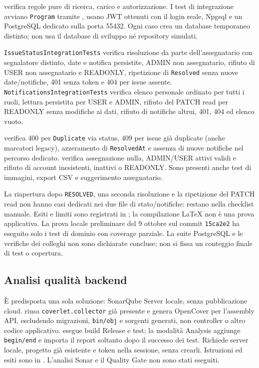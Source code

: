 \documentclass[12pt,a4paper]{article}
\begin{document}
 verifica regole pure di ricerca, carico e autorizzazione. I test di integrazione avviano \texttt{Program} tramite , usano JWT ottenuti con il login reale, Npgsql e un PostgreSQL dedicato sulla porta 55432. Ogni caso crea un database temporaneo distinto; non usa il database di sviluppo né repository simulati.

\texttt{IssueStatusIntegrationTests} verifica risoluzione da parte dell'assegnatario con segnalatore distinto, date e notifica persistite, ADMIN non assegnatario, rifiuto di USER non assegnatario e READONLY, ripetizione di \texttt{Resolved} senza nuove date/notifiche, 401 senza token e 404 per issue assente. \texttt{NotificationsIntegrationTests} verifica elenco personale ordinato per tutti i ruoli, lettura persistita per USER e ADMIN, rifiuto del PATCH read per READONLY senza modifiche ai dati, rifiuto di notifiche altrui, 401, 404 ed elenco vuoto.

 verifica 400 per \texttt{Duplicate} via status, 409 per issue già duplicate (anche marcatori legacy), azzeramento di \texttt{ResolvedAt} e assenza di nuove notifiche nel percorso dedicato.  verifica assegnazione nulla, ADMIN/USER attivi validi e rifiuto di account inesistenti, inattivi o READONLY. Sono presenti anche test di immagini, export CSV e suggerimento assegnatario.

La riapertura dopo \texttt{RESOLVED}, una seconda risoluzione e la ripetizione del PATCH read non hanno casi dedicati nei due file di stato/notifiche: restano nella checklist manuale. Esiti e limiti sono registrati in ; la compilazione LaTeX non è una prova applicativa. La prova locale preliminare del 9 ottobre sul commit \texttt{15ca2e2} ha eseguito solo i test di dominio con coverage parziale. La suite PostgreSQL e le verifiche dei colleghi non sono dichiarate concluse; non si fissa un conteggio finale di test o copertura.

\subsection{Analisi qualità backend}

È predisposta una sola soluzione: SonarQube Server locale, senza pubblicazione cloud.  riusa \texttt{coverlet.collector} già presente e genera OpenCover per l'assembly API, escludendo migrazioni, \texttt{bin/obj} e sorgenti generati, non controller o altro codice applicativo.  esegue build Release e test; la modalità Analysis aggiunge \texttt{begin/end} e importa il report soltanto dopo il successo dei test. Richiede server locale, progetto già esistente e token nella sessione, senza crearli. Istruzioni ed esiti sono in . L'analisi Sonar e il Quality Gate non sono stati eseguiti.
\end{document}
